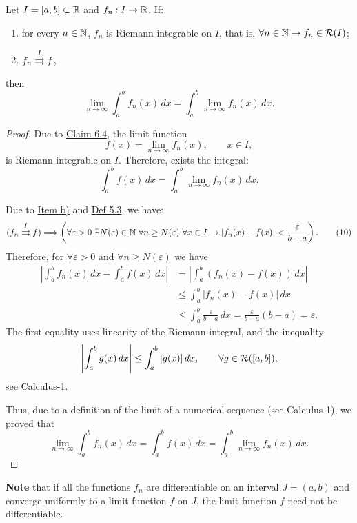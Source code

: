 \begin{claim}\label{claim:6.5}
Let $I=[a,b]\subset\mathbb{R}$ and $f_n:I\to\mathbb{R}$.
If:
\begin{enumerate}[label=\alph*)]
    \item\label{item:claim:6.5:a} for every $n\in\mathbb{N}$, $f_n$ is Riemann integrable on $I$, that is, $\forall n\in\mathbb{N}\to f_n\in\mathcal{R}(I)$;
    \item\label{item:claim:6.5:b} $f_n\mathrel{\overset{I}{\rightrightarrows}}f$,
\end{enumerate}
then
\[
\lim_{n\to\infty}\int_a^b f_n(x)\,dx
=
\int_a^b\lim_{n\to\infty}f_n(x)\,dx.
\]
\end{claim}

\begin{proof}
Due to \hyperref[claim:6.4]{Claim 6.4}, the limit function
\[
f(x)=\lim_{n\to\infty}f_n(x),\qquad x\in I,
\]
is Riemann integrable on $I$.
Therefore, exists the integral:
\[
\int_a^b f(x)\,dx=\int_a^b\lim_{n\to\infty}f_n(x)\,dx.
\]

Due to \hyperref[item:claim:6.5:b]{Item b)} and \hyperref[def:5.3]{Def 5.3}, we have:
\[
(f_n\mathrel{\overset{I}{\rightrightarrows}}f)
\Longrightarrow
\left(\forall\varepsilon>0\ \exists N(\varepsilon)\in\mathbb{N}\ \forall n\geq N(\varepsilon)\ \forall x\in I
\to |f_n(x)-f(x)|<\frac{\varepsilon}{b-a}\right).
\tag{10}\label{eq:6:10:1}
\]
Therefore, for $\forall\varepsilon>0$ and $\forall n\geq N(\varepsilon)$ we have
\begin{align*}
\left|\int_a^b f_n(x)\,dx-\int_a^b f(x)\,dx\right|
&=\left|\int_a^b(f_n(x)-f(x))\,dx\right|\\
&\leq\int_a^b|f_n(x)-f(x)|\,dx\\
&\leq\int_a^b\frac{\varepsilon}{b-a}\,dx
=\frac{\varepsilon}{b-a}(b-a)=\varepsilon.
\end{align*}
The first equality uses linearity of the Riemann integral, and the inequality
\[
\left|\int_a^b g(x)\,dx\right|\leq\int_a^b|g(x)|\,dx,
\qquad \forall g\in\mathcal{R}([a,b]),
\]
see Calculus-1.

Thus, due to a definition of the limit of a numerical sequence (see Calculus-1), we proved that
\[
\lim_{n\to\infty}\int_a^b f_n(x)\,dx
=\int_a^b f(x)\,dx
=\int_a^b\lim_{n\to\infty}f_n(x)\,dx.
\]
\end{proof}

\textbf{Note} that if all the functions $f_n$ are differentiable on an interval $J=(a,b)$ and converge uniformly to a limit function $f$ on $J$, the limit function $f$ need not be differentiable.

